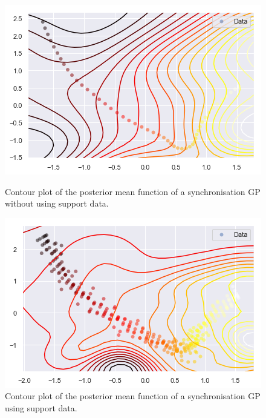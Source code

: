 \begin{figure}[H]
  \begin{minipage}{.46\textwidth}
    \includegraphics[scale=0.48,width=\textwidth]{figures/heat-without-support-data.png}
    \caption{Contour plot of the posterior mean function of a
      synchronisation GP without using support data.}
    \label{fig:heightmap-without-support}
  \end{minipage}
  \hspace{5pt}
  \begin{minipage}{.46\textwidth}
    \includegraphics[scale=0.5,width=\textwidth]{figures/heat-with-support-data.png}
    \caption{Contour plot of the posterior mean function of a
      synchronisation GP using support data.}
    \label{fig:heightmap-with-support}
  \end{minipage}
\end{figure}

